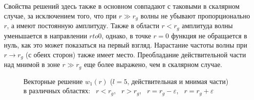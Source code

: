 \documentclass[\docroot/reports/draft/report.tex]{subfiles}
\begin{document}
        Свойства решений здесь также в основном совпадают с таковыми в скалярном случае, за исключением того, что при $r \gg r_g$ волны не убывают пропорционально $r$, а имеют постоянную амплитуду. Также в области $r < r_g$ амплитуда волны уменьшается в направлении $r to 0$, однако, в точке $r = 0$ функция не обращается в нуль, как это может показаться на первый взгляд. Нарастание частоты волны при $r \to r_g$ (с обеих сторон) также имеет место. Преобладание действительной части над мнимой в зоне $r \gg r_g$ еще более выражено, чем в скалярном случае.
        \begin{figure}[h]
            \centering
            \hspace{8pt}%
            \hspace{8pt}%
            \hspace{8pt}%
            \hspace{8pt}%
            \caption[]{Векторные решение $w_1(r)$ ($l = 5$, действительная и мнимая части) в различных областях:
                ~$r<r_g$,
                ~$r > r_g$,
                ~$r = r_g - \varepsilon$,
                ~$r = r_g + \varepsilon$}%
            \label{fig:vec-rg}%
        \end{figure}
\end{document}
